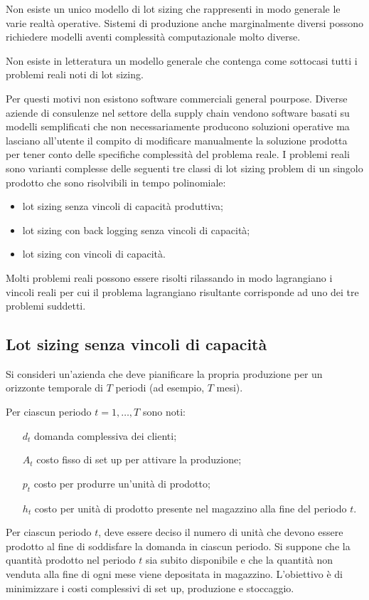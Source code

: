 Non esiste un unico modello di lot sizing che rappresenti in modo generale le varie realtà operative. Sistemi di produzione anche marginalmente diversi possono richiedere modelli aventi complessità computazionale molto diverse.

Non esiste in letteratura un modello generale che contenga come sottocasi tutti i problemi reali noti di lot sizing.

Per questi motivi non esistono software commerciali general pourpose.\newline
Diverse aziende di consulenze nel settore della supply chain vendono software basati su modelli semplificati che non necessariamente producono soluzioni operative ma lasciano all'utente il compito di modificare manualmente la soluzione prodotta per tener conto delle specifiche complessità del problema reale.\newline
I problemi reali sono varianti complesse delle seguenti tre classi di lot sizing problem di un singolo prodotto che sono risolvibili in tempo polinomiale:
\begin{itemize}
	\item lot sizing senza vincoli di capacità produttiva;
	\item lot sizing con back logging senza vincoli di capacità;
	\item lot sizing con vincoli di capacità.
\end{itemize}
Molti problemi reali possono essere risolti rilassando in modo lagrangiano i vincoli reali per cui il problema lagrangiano risultante corrisponde ad uno dei tre problemi suddetti.

\subsection{Lot sizing senza vincoli di capacit\`a}
Si consideri un'azienda che deve pianificare la propria produzione per un orizzonte temporale di $T$ periodi (ad esempio, $T$ mesi).

Per ciascun periodo $t=1,\dots,T$ sono noti:
\begin{itemize}
	\item[\textit{$d_{t}$}] domanda complessiva dei clienti;
	\item[\textit{$A_{t}$}] costo fisso di set up per attivare la produzione;
	\item[\textit{$p_{t}$}] costo per produrre un'unità di prodotto;
	\item[\textit{$h_{t}$}] costo per unità di prodotto presente nel magazzino alla fine del periodo $t$. 
\end{itemize}
Per ciascun periodo $t$, deve essere deciso il numero di unità che devono essere prodotto al fine di soddisfare la domanda in ciascun periodo.\newline
Si suppone che la quantità prodotto nel periodo $t$ sia subito disponibile e che la quantità non venduta alla fine di ogni mese viene depositata in magazzino.
L'obiettivo è di minimizzare i costi complessivi di set up, produzione e stoccaggio.

